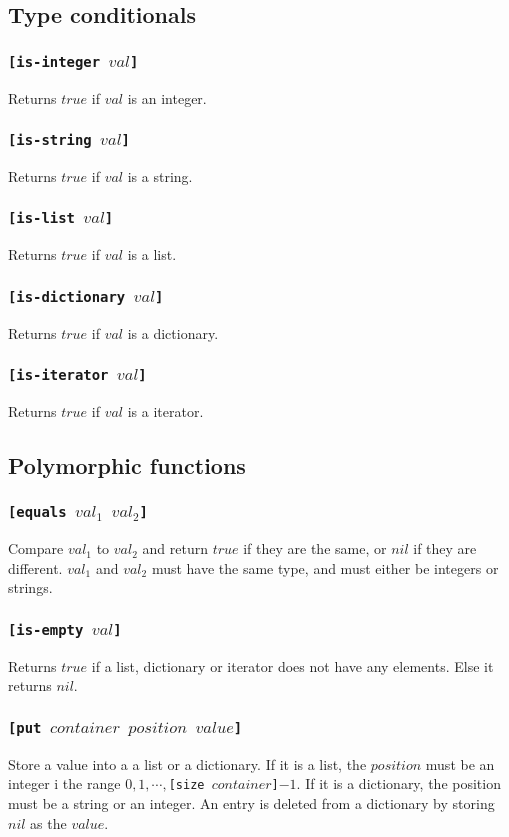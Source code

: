 \subsection{Type conditionals}
\subsubsection{\tt{[is-integer }$val$\tt{]}}
Returns $true$ if $val$ is an integer.
\subsubsection{\tt{[is-string }$val$\tt{]}}
Returns $true$ if $val$ is a string.
\subsubsection{\tt{[is-list }$val$\tt{]}}
Returns $true$ if $val$ is a list.
\subsubsection{\tt{[is-dictionary }$val$\tt{]}}
Returns $true$ if $val$ is a dictionary.
\subsubsection{\tt{[is-iterator }$val$\tt{]}}
Returns $true$ if $val$ is a iterator.

\subsection{Polymorphic functions}
\subsubsection{\tt{[equals }$val_1$ $val_2$\tt{]}}
Compare $val_1$ to $val_2$ and return $true$ if they are the same, or $nil$ if they are different. $val_1$ and $val_2$ must have the same type, and must either be integers or strings.
\subsubsection{\tt{[is-empty }$val$\tt{]}}
Returns $true$ if a list, dictionary or iterator does not have any elements. Else it returns $nil$.
\subsubsection{\tt{[put }$container$ $position$ $value$\tt{]}}
Store a value into a a list or a dictionary. If it is a list, the $position$ must be an integer i the range $0,1, \cdots, ${\tt{[size }}$container${\tt{]}}$-1$.
If it is a dictionary, the position must be a string or an integer. An entry is deleted from a dictionary by storing $nil$ as the $value$.
